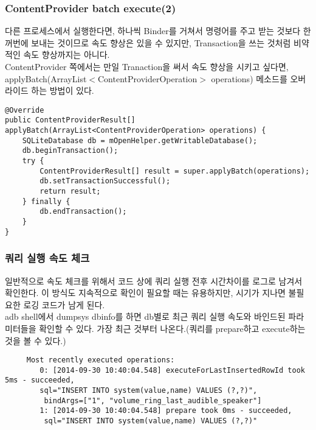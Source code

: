 \documentclass{beamer}
\newcommand\Fontvi{\fontsize{8}{9.6}\selectfont}
\begin{document}
\begin{frame}[fragile]
\frametitle{ContentProvider batch execute(2)}
다른 프로세스에서 실행한다면, 하나씩 Binder를 거쳐서 명령어를 주고 받는 것보다 한꺼번에 보내는 것이므로 속도 향상은 있을 수 있지만, Transaction을 쓰는 것처럼 비약적인 속도 향상까지는 아니다.\\
ContentProvider 쪽에서는 만일 Tranaction을 써서 속도 향상을 시키고 싶다면,
applyBatch(ArrayList$<$ContentProviderOperation$>$ operations) 메소드를 오버라이드 하는 방법이 있다.
\Fontvi
\begin{verbatim} 
@Override
public ContentProviderResult[] applyBatch(ArrayList<ContentProviderOperation> operations) {
    SQLiteDatabase db = mOpenHelper.getWritableDatabase();
    db.beginTransaction();
    try {
        ContentProviderResult[] result = super.applyBatch(operations);
        db.setTransactionSuccessful();
        return result;
    } finally {
        db.endTransaction();
    }
}
\end{verbatim}
\end{frame}


\begin{frame}[fragile]
\frametitle{쿼리 실행 속도 체크}
일반적으로 속도 체크를 위해서 코드 상에 쿼리 실행 전후 시간차이를 로그로 남겨서 확인한다. 이 방식도 지속적으로 확인이 필요할 때는 유용하지만, 시기가 지나면 불필요한 로깅 코드가 남게 된다.\\
adb shell에서 dumpsys dbinfo를 하면 db별로 최근 쿼리 실행 속도와 바인드된 파라미터들을 확인할 수 있다. 
가장 최근 것부터 나온다.(쿼리를 prepare하고 execute하는 것을 볼 수 있다.)

\Fontvi
\begin{verbatim} 
     Most recently executed operations:
        0: [2014-09-30 10:40:04.548] executeForLastInsertedRowId took 5ms - succeeded, 
        sql="INSERT INTO system(value,name) VALUES (?,?)",
         bindArgs=["1", "volume_ring_last_audible_speaker"]
        1: [2014-09-30 10:40:04.548] prepare took 0ms - succeeded,
         sql="INSERT INTO system(value,name) VALUES (?,?)"
\end{verbatim}

\end{frame}
\end{document}
